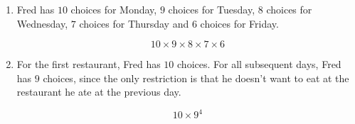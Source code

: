 \begin{enumerate}[label=(\alph*)]
\item Fred has $10$ choices for Monday, $9$ choices for Tuesday, $8$ choices for Wednesday, $7$ choices for Thursday and $6$ choices for Friday. 

  $$ 10 \times 9 \times 8 \times 7 \times6 $$

\item For the first restaurant, Fred has $10$ choices. For all subsequent days, Fred has $9$ choices, since the only restriction is that he doesn't want to eat at the restaurant he ate at the previous day.

  $$ 10 \times 9^{4} $$
\end{enumerate}